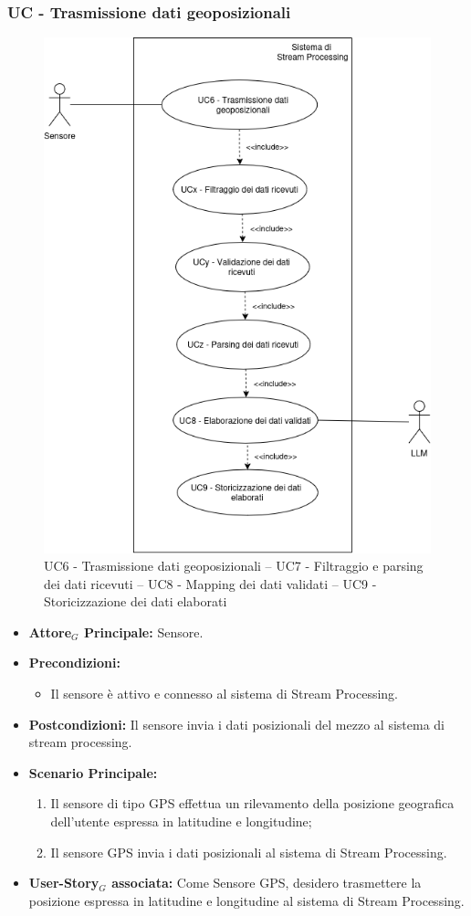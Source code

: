 \documentclass[11pt]{article}
\begin{document}
\begin{justify}
\subsubsection{\textbf{UC - Trasmissione dati geoposizionali}}
\begin{figure}[H]
    \centering
    \includegraphics[width=0.7\linewidth]{UC6-7-8-9image.png}
    \caption{UC6 - Trasmissione dati geoposizionali -- UC7 - Filtraggio e parsing dei dati ricevuti -- UC8 - Mapping dei dati validati -- UC9 - Storicizzazione dei dati elaborati}
    \label{fig:UC6789}
\end{figure}
\label{UC6}
\begin{itemize}
    \item \textbf{Attore$_G$ Principale:} Sensore.
    \item \textbf{Precondizioni:} 
        \begin{itemize}
    	\item Il sensore è attivo e connesso al sistema di Stream Processing.
        \end{itemize}
    \item \textbf{Postcondizioni:} Il sensore invia i dati posizionali del mezzo al sistema di stream processing.
    \item \textbf{Scenario Principale:} 
        \begin{enumerate}
            \item Il sensore di tipo GPS effettua un rilevamento della posizione geografica dell'utente espressa in latitudine e longitudine;
            \item Il sensore GPS invia i dati posizionali al sistema di Stream Processing.
        \end{enumerate}
    \item \textbf{User-Story$_G$ associata:} Come Sensore GPS, desidero trasmettere la posizione espressa in latitudine e longitudine al sistema di Stream Processing.


\end{itemize}
\end{justify}
\end{document}
